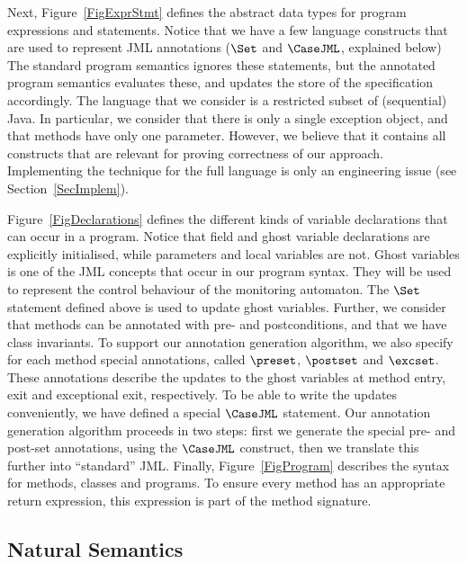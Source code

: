 Next, Figure~\ref{FigExprStmt} defines the abstract data types for
program expressions and statements. Notice that we have a few language
constructs that are used to represent JML annotations (\(\Set\) and
\(\CaseJML\), explained below) The standard program semantics ignores 
these statements, but the annotated program semantics evaluates these,
and updates the store of the specification accordingly. The language
that we consider is a restricted subset of (sequential) Java. In
particular, we consider that there is only a single exception object,
and that methods have only one parameter. However, we believe that it
contains all constructs that are relevant for proving correctness of
our approach. Implementing the technique for the full language is only
an engineering issue (see Section~\ref{SecImplem}).

Figure~\ref{FigDeclarations} defines the different kinds of variable
declarations that can occur in a program. Notice that field and ghost
variable declarations are explicitly initialised, while parameters and
local variables are not. Ghost variables is one of the JML concepts
that occur in our program syntax. They will be used to represent the
control behaviour of the monitoring automaton. The \(\Set\) statement
defined above is used to update ghost variables. Further, we consider
that methods can be annotated with pre- and postconditions, and that
we have class invariants. To support our annotation generation
algorithm, we also specify for each method special annotations, called
\(\preset\),
\(\postset\) and \(\excset\). These annotations describe the updates
to the ghost variables at method entry, exit and exceptional exit,
respectively. To be able to write the updates conveniently, we have
defined a special \(\CaseJML\) statement. Our annotation generation
algorithm proceeds in two steps: first we generate the special pre-
and post-set annotations, using the \(\CaseJML\) construct, then we
translate this further into ``standard'' JML. Finally,
Figure~\ref{FigProgram} describes the syntax for methods, classes and
programs. To ensure every method has an appropriate return expression,
this expression is part of the method signature.

\subsection{Natural Semantics}\label{SecSemantics}




